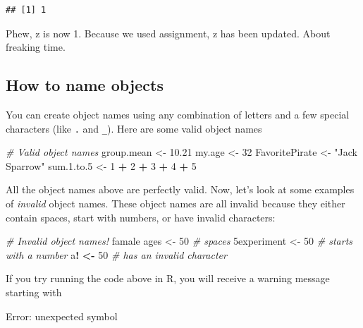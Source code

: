 \documentclass[
]{book}
\newenvironment{Shaded}{\begin{snugshade}}{\end{snugshade}}
\newcommand{\CommentTok}[1]{\textcolor[rgb]{0.56,0.35,0.01}{\textit{#1}}}
\newcommand{\DecValTok}[1]{\textcolor[rgb]{0.00,0.00,0.81}{#1}}
\newcommand{\ErrorTok}[1]{\textcolor[rgb]{0.64,0.00,0.00}{\textbf{#1}}}
\newcommand{\FloatTok}[1]{\textcolor[rgb]{0.00,0.00,0.81}{#1}}
\newcommand{\NormalTok}[1]{#1}
\newcommand{\OperatorTok}[1]{\textcolor[rgb]{0.81,0.36,0.00}{\textbf{#1}}}
\newcommand{\StringTok}[1]{\textcolor[rgb]{0.31,0.60,0.02}{#1}}
\begin{document}
\begin{verbatim}
## [1] 1
\end{verbatim}

Phew, z is now 1. Because we used assignment, z has been updated. About freaking time.

\hypertarget{how-to-name-objects}{%
\subsection{How to name objects}\label{how-to-name-objects}}

You can create object names using any combination of letters and a few special characters (like \texttt{.} and \texttt{\_}). Here are some valid object names

\begin{Shaded}
\begin{Highlighting}[]
\CommentTok{# Valid object names}
\NormalTok{group.mean <-}\StringTok{ }\FloatTok{10.21}
\NormalTok{my.age <-}\StringTok{ }\DecValTok{32}
\NormalTok{FavoritePirate <-}\StringTok{ "Jack Sparrow"}
\NormalTok{sum.}\FloatTok{1.}\NormalTok{to}\FloatTok{.5}\NormalTok{ <-}\StringTok{ }\DecValTok{1} \OperatorTok{+}\StringTok{ }\DecValTok{2} \OperatorTok{+}\StringTok{ }\DecValTok{3} \OperatorTok{+}\StringTok{ }\DecValTok{4} \OperatorTok{+}\StringTok{ }\DecValTok{5}
\end{Highlighting}
\end{Shaded}

All the object names above are perfectly valid. Now, let's look at some examples of \emph{invalid} object names. These object names are all invalid because they either contain spaces, start with numbers, or have invalid characters:

\begin{Shaded}
\begin{Highlighting}[]
\CommentTok{# Invalid object names!}
\NormalTok{famale ages <-}\StringTok{ }\DecValTok{50} \CommentTok{# spaces}
\NormalTok{5experiment <-}\StringTok{ }\DecValTok{50} \CommentTok{# starts with a number}
\NormalTok{a}\OperatorTok{!}\StringTok{ }\ErrorTok{<}\OperatorTok{-}\StringTok{ }\DecValTok{50} \CommentTok{# has an invalid character}
\end{Highlighting}
\end{Shaded}

If you try running the code above in R, you will receive a warning message starting with

\begin{error}

Error: unexpected symbol

\end{error}
\end{document}
